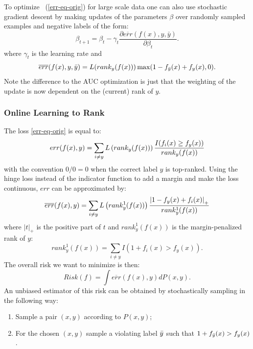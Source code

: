 To optimize ~(\ref{err-eq-orig}) for large scale data one can also use stochastic gradient descent
by making updates of the parameters $\beta$ over randomly sampled examples and negative labels 
of the form:
\begin{equation}
\label{eq:sgdstep}
\beta_{t+1} = \beta_t - \gamma_t \frac{\partial \overline{err}(f(x),y,\bar{y})}{\partial \beta_t}.
\end{equation}
where $\gamma_t$ is the learning rate and
\[
\overline{err}(f(x),y,\bar{y}) = {L}(rank_y(f(x))) \max(1 - f_{\bar{y}}(x) + f_y(x), 0).
\]
Note the difference to the AUC optimization is just that 
the weighting of the update is now dependent on the
(current) rank of $y$.


\subsubsection{Online Learning to Rank}
%
The loss \eqref{err-eq-orig} is equal to:
\begin{equation*} 
err(f(x),y) =  \sum_{i \neq y}  {L}\left(rank_y(f(x))\right) \\  \frac{I( f_i(x) \geq f_y(x) )}{rank_y(f(x))}
\end{equation*}
with the convention $0/0=0$ when the correct label $y$ is
top-ranked. Using the hinge loss instead of the indicator function to
add a margin and make the loss continuous, $err$ can be approximated
by:
\begin{equation}
\label{err-eq}
\overline{err}(f(x),y) =  \sum_{i \neq y}  {L}\left(rank^1_y(f(x))\right) \\  \frac{\left|1- f_y(x) + f_i(x) \right|_+}{rank^1_y(f(x))}
\end{equation}
where $|t|_+$ is the positive part of $t$ and $rank^1_y(f(x))$ is the
margin-penalized rank of $y$:
\begin{equation} \label{eq-rank1}
rank^1_y(f(x)) = \sum_{i\neq y} I( 1+f_i(x) > f_y(x) ).
\end{equation}
The overall risk we want to minimize is then:
\begin{equation} 
\label{risk}
Risk(f) = \int  \overline{err}(f(x),y)   dP(x,y).
\end{equation}
An unbiased estimator of this risk can be obtained by stochastically sampling in the following way:
\begin{enumerate}
\item Sample a pair $(x,y)$ according to $P(x,y)$;
\item For the chosen $(x,y)$ sample a violating label ${\bar{y}}$ such
  that $1+f_{\bar{y}}(x)>f_y(x)$.
\end{enumerate}
